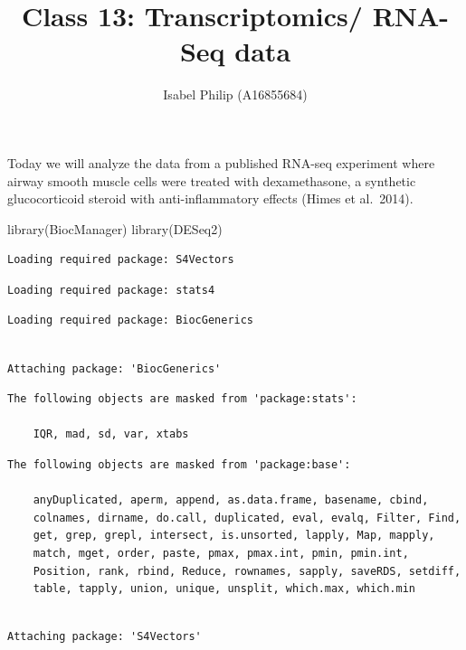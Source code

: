 \documentclass[
  letterpaper,
  DIV=11,
  numbers=noendperiod]{scrartcl}
\title{Class 13: Transcriptomics/ RNA-Seq data}
\author{Isabel Philip (A16855684)}
\date{}
\newenvironment{Shaded}{\begin{snugshade}}{\end{snugshade}}
\newcommand{\FunctionTok}[1]{\textcolor[rgb]{0.28,0.35,0.67}{#1}}
\newcommand{\NormalTok}[1]{\textcolor[rgb]{0.00,0.23,0.31}{#1}}
\begin{document}
\maketitle


Today we will analyze the data from a published RNA-seq experiment where
airway smooth muscle cells were treated with dexamethasone, a synthetic
glucocorticoid steroid with anti-inflammatory effects (Himes et
al.~2014).

\begin{Shaded}
\begin{Highlighting}[]
\FunctionTok{library}\NormalTok{(BiocManager)}
\FunctionTok{library}\NormalTok{(DESeq2)}
\end{Highlighting}
\end{Shaded}

\begin{verbatim}
Loading required package: S4Vectors
\end{verbatim}

\begin{verbatim}
Loading required package: stats4
\end{verbatim}

\begin{verbatim}
Loading required package: BiocGenerics
\end{verbatim}

\begin{verbatim}

Attaching package: 'BiocGenerics'
\end{verbatim}

\begin{verbatim}
The following objects are masked from 'package:stats':

    IQR, mad, sd, var, xtabs
\end{verbatim}

\begin{verbatim}
The following objects are masked from 'package:base':

    anyDuplicated, aperm, append, as.data.frame, basename, cbind,
    colnames, dirname, do.call, duplicated, eval, evalq, Filter, Find,
    get, grep, grepl, intersect, is.unsorted, lapply, Map, mapply,
    match, mget, order, paste, pmax, pmax.int, pmin, pmin.int,
    Position, rank, rbind, Reduce, rownames, sapply, saveRDS, setdiff,
    table, tapply, union, unique, unsplit, which.max, which.min
\end{verbatim}

\begin{verbatim}

Attaching package: 'S4Vectors'
\end{verbatim}
\end{document}
